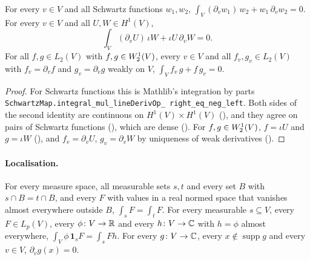 \begin{theorem}
\label{thm:sobolev-one-integration-by-parts}
\leanok
{}
For every $v \in V$ and all Schwartz functions $w_1, w_2$,
$\int_V (\partial_v w_1) \, w_2 + w_1 \, \partial_v w_2 = 0$. For every $v \in V$ and all
$U, W \in H^1(V)$,
\[
  \int_V (\partial_v U) \, \iota W + \iota U \, \partial_v W = 0 .
\]
For all $f, g \in L_2(V)$ with $f, g \in W^{1}_{2}(V)$, every $v \in V$ and all
$f_v, g_v \in L_2(V)$ with $f_v = \partial_v f$ and $g_v = \partial_v g$ weakly on $V$,
$\int_V f_v \, g + f \, g_v = 0$.
\end{theorem}

\begin{proof}
\leanok
For Schwartz functions this is Mathlib's integration by parts
\texttt{SchwartzMap.\allowbreak integral\_\allowbreak mul\_\allowbreak lineDerivOp\_\allowbreak
right\_\allowbreak eq\_\allowbreak neg\_\allowbreak left}. Both sides of the second identity are
continuous on $H^1(V) \times H^1(V)$ (), and they agree on pairs of
Schwartz functions (), which are dense
(). For $f, g \in W^{1}_{2}(V)$, $f = \iota U$ and
$g = \iota W$ (), and $f_v = \partial_v U$,
$g_v = \partial_v W$ by uniqueness of weak derivatives
().
\end{proof}

\paragraph{Localisation.}

\begin{lemma}
\label{lem:localisation-integrals}
\leanok
{}
For every measure space, all measurable sets $s, t$ and every set $B$ with
$s \cap B = t \cap B$, and every $F$ with values in a real normed space that vanishes almost
everywhere outside $B$, $\int_s F = \int_t F$. For every measurable $s \subseteq V$, every
$F \in L_p(V)$, every $\phi \colon V \to \mathbb{R}$ and every $h \colon V \to \mathbb{C}$ with $h = \phi$ almost
everywhere, $\int_V \phi \, \mathbf 1_s F = \int_s F h$. For every $g \colon V \to \mathbb{C}$, every
$x \notin \operatorname{supp} g$ and every $v \in V$, $\partial_v g(x) = 0$.
\end{lemma}

